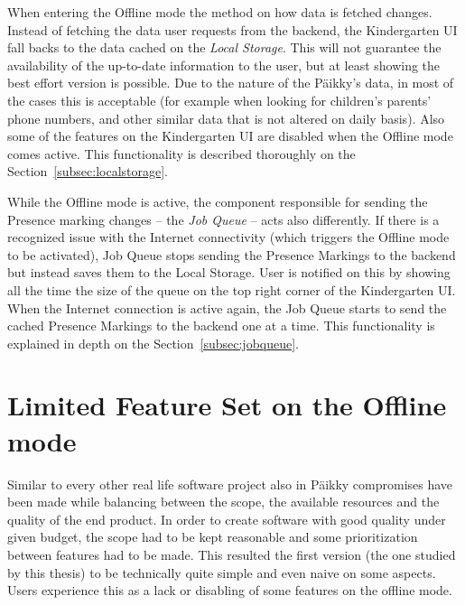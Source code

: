 When entering the Offline mode the method on how data is fetched changes. Instead of fetching the data user requests from the backend, the Kindergarten UI fall backs to the data cached on the \textit{Local Storage}. This will not guarantee the availability of the up-to-date information to the user, but at least showing the best effort version is possible. Due to the nature of the Päikky's data, in most of the cases this is acceptable (for example when looking for children's parents' phone numbers, and other similar data that is not altered on daily basis). Also some of the features on the Kindergarten UI are disabled when the Offline mode comes active. This functionality is described thoroughly on the Section~\ref{subsec:localstorage}.

While the Offline mode is active, the component responsible for sending the Presence marking changes – the \textit{Job Queue} – acts also differently. If there is a recognized issue with the Internet connectivity (which triggers the Offline mode to be activated), Job Queue stops sending the Presence Markings to the backend but instead saves them to the Local Storage. User is notified on this by showing all the time the size of the queue on the top right corner of the Kindergarten UI. When the Internet connection is active again, the Job Queue starts to send the cached Presence Markings to the backend one at a time. This functionality is explained in depth on the Section~\ref{subsec:jobqueue}.





\section{Limited Feature Set on the Offline mode}
\label{sec:limitedfeatureset}

Similar to every other real life software project also in Päikky compromises have been made while balancing between the scope, the available resources and the quality of the end product. In order to create software with good quality under given budget, the scope had to be kept reasonable and some prioritization between features had to be made. This resulted the first version (the one studied by this thesis) to be technically quite simple and even naive on some aspects. Users experience this as a lack or disabling of some features on the offline mode.




